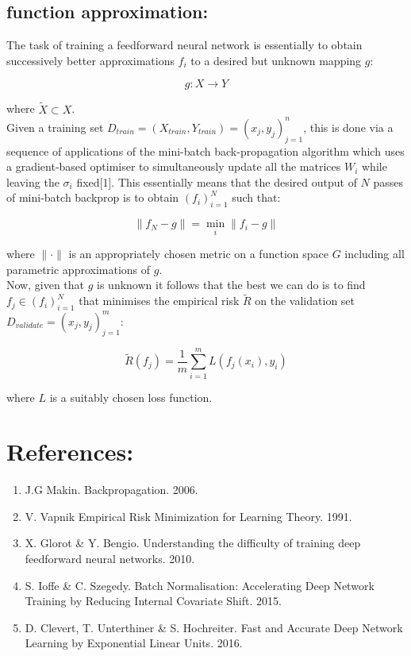 \documentclass[11pt]{article}
\theoremstyle{plain}
\theoremstyle{definition}
\begin{document}
\subsection{function approximation: }

The task of training a feedforward neural network is essentially to obtain successively better approximations
$f_i$ to a desired but unknown mapping $g$:

\begin{equation}
g: X \rightarrow Y
\end{equation}

where $ \widetilde{X} \subset X$. \\

Given a training set $ D_{train} = (X_{train},Y_{train}) = (x_j,y_j)_{j=1}^n$, this is done via a sequence of applications of the mini-batch back-propagation
algorithm which uses a gradient-based optimiser to simultaneously update all the matrices $W_i$ while leaving the $\sigma_i$ fixed[1]. This essentially 
means that the desired output of $N$ passes of mini-batch backprop is to obtain $(f_i)_{i=1}^N$ such that:

\begin{equation}
\lVert f_N -g \rVert = \displaystyle{\min_{i} {\lVert f_i -g \rVert } }
\end{equation}

where $\lVert \cdot \rVert$ is an appropriately chosen metric on a function space $G$ including all parametric approximations of $g$. \\

Now, given that $g$ is unknown it follows that the best we can do is to find $f_j \in (f_i)_{i=1}^N$ that minimises the empirical risk $\tilde{R}$ on the validation
set $D_{validate} = (x_j,y_j)_{j=1}^m$:

\begin{equation}
\tilde{R}(f_j) = \frac{1}{m} \sum_{i=1}^{m} L(f_j(x_i),y_i)
\end{equation}

where $L$ is a suitably chosen loss function. \\


\section{References:}

\begin{enumerate}
\item{J.G Makin. Backpropagation. 2006.}
\item{V. Vapnik Empirical Risk Minimization for Learning Theory. 1991.}
\item{X. Glorot \& Y. Bengio. Understanding the difficulty of training deep feedforward neural networks. 2010.}
\item{S. Ioffe \& C. Szegedy. Batch Normalisation: Accelerating Deep Network Training by Reducing Internal Covariate Shift. 2015.} 
\item{D. Clevert, T. Unterthiner \& S. Hochreiter. Fast and Accurate Deep Network Learning by Exponential Linear Units. 2016.}

\end{enumerate}


 
 
\end{document}
